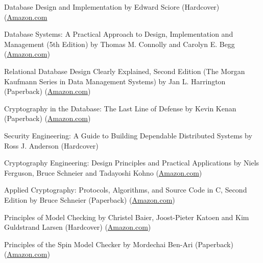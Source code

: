 \documentclass[10pt]{article}
\newenvironment{innerlist}[1][\enskip\textbullet]%
        {\begin{compactitem}[#1]}{\end{compactitem}}
\begin{document}
\begin{innerlist}
                \item Database Design and Implementation
                  by Edward Sciore (Hardcover)
                  (\href{http://www.amazon.com/Database-Design-Implementation-Edward-Sciore/dp/0471757160}{Amazon.com}
                \item Database Systems: A Practical Approach to Design, Implementation and Management (5th Edition)
                  by Thomas M. Connolly and Carolyn E. Begg
                  (\href{http://www.amazon.com/Database-Systems-Practical-Implementation-Management/dp/0321523067}{Amazon.com})
                \item Relational Database Design Clearly Explained, Second Edition (The Morgan Kaufmann Series in Data Management Systems)
                  by Jan L. Harrington (Paperback)
                  (\href{http://www.amazon.com/Relational-Database-Explained-Kaufmann-Management/dp/1558608206}{Amazon.com})

                \item Cryptography in the Database: The Last Line of Defense
                  by Kevin Kenan (Paperback)
                  (\href{http://www.amazon.com/Cryptography-Database-Last-Line-Defense/dp/0321320735}{Amazon.com})
                \item Security Engineering: A Guide to Building Dependable Distributed Systems
                  by Ross J. Anderson (Hardcover)
                \item Cryptography Engineering: Design Principles and Practical Applications
                  by Niels Ferguson, Bruce Schneier and Tadayoshi Kohno
                  (\href{http://www.amazon.com/Cryptography-Engineering-Principles-Practical-Applications/dp/0470474246}{Amazon.com})
                \item Applied Cryptography: Protocols, Algorithms, and Source Code in C, Second Edition
                  by Bruce Schneier (Paperback)
                  (\href{http://www.amazon.com/Applied-Cryptography-Protocols-Algorithms-Source/dp/0471117099}{Amazon.com})

                \item Principles of Model Checking
                  by Christel Baier, Joost-Pieter Katoen and Kim Guldstrand Larsen (Hardcover)
                  (\href{http://www.amazon.com/Principles-Model-Checking-Christel-Baier/dp/026202649X}{Amazon.com})
                \item Principles of the Spin Model Checker
                  by Mordechai Ben-Ari (Paperback)
                  (\href{http://www.amazon.com/Principles-Model-Checker-Mordechai-Ben-Ari/dp/1846287693}{Amazon.com})


\end{innerlist}
\end{document}
